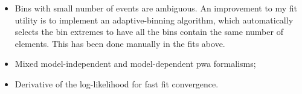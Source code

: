     \begin{itemize}
        \item 
            Bins with small number of events are ambiguous. 
            An improvement to my fit utility is to implement an adaptive-binning algorithm, which automatically selects the bin extremes to have all the bins contain the same number of elements.
            This has been done manually in the fits above.

        \item Mixed model-independent and model-dependent \ac{pwa} formalisms;

        \item Derivative of the log-likelihood for fast fit convergence.
    \end{itemize}


